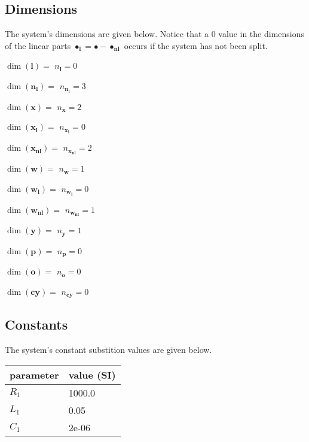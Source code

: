 \documentclass[11pt, oneside]{article}      %
\begin{document}
\subsection{Dimensions}
%
The system's dimensions are given below.
%
Notice that a 0 value in the dimensions of the linear parts
$\bullet_{\mathbf{l}} = \bullet-\bullet_{\mathbf{nl}}$ occurs if the system has
not been split.
%
\par  $\dim(\mathbf{l})=$ $ n_\mathbf{l} = 0$\par  $\dim(\mathbf{n_{l}})=$ $ n_\mathbf{n_{l}} = 3$\par  $\dim(\mathbf{x})=$ $ n_\mathbf{x} = 2$\par  $\dim(\mathbf{x_{l}})=$ $ n_\mathbf{x_{l}} = 0$\par  $\dim(\mathbf{x_{nl}})=$ $ n_\mathbf{x_{nl}} = 2$\par  $\dim(\mathbf{w})=$ $ n_\mathbf{w} = 1$\par  $\dim(\mathbf{w_{l}})=$ $ n_\mathbf{w_{l}} = 0$\par  $\dim(\mathbf{w_{nl}})=$ $ n_\mathbf{w_{nl}} = 1$\par  $\dim(\mathbf{y})=$ $ n_\mathbf{y} = 1$\par  $\dim(\mathbf{p})=$ $ n_\mathbf{p} = 0$\par  $\dim(\mathbf{o})=$ $ n_\mathbf{o} = 0$\par  $\dim(\mathbf{cy})=$ $ n_\mathbf{cy} = 0$
%
%
%
\subsection{Constants}
%
The system's constant substition values are given below.
%
\begin{center}
%
\begin{tabular}{ll}
%
\hline
parameter & value (SI)
\\ \hline
$R_{\mathrm{1}}$ & 1000.0
\\
$L_{\mathrm{1}}$ & 0.05
\\
$C_{\mathrm{1}}$ & 2e-06
\\
\hline
\end{tabular}
%
\end{center}
%
%
%
\end{document}
